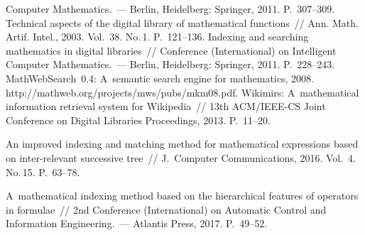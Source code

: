 \begin{multicols}{2}
{{\begin{thebibliography}{99}
Computer Mathematics.~--- Berlin, Heidelberg: Springer, 2011. P.~307--309.
 Technical aspects of the digital library of mathematical 
functions~// Ann. Math. Artif. Intel., 2003. Vol.~38. No.\,1. P.~121--136.
 Indexing and searching 
mathematics in digital libraries~// Conference (International) on Intelligent Computer 
Mathematics.~--- Berlin, Heidelberg: Springer, 2011. P.~228--243. 
 MathWebSearch~0.4: 
A~semantic search engine for mathematics, 2008. {\sf  
http://mathweb.org/\linebreak projects/mws/pubs/mkm08.pdf}.
 Wikimirs: A~mathematical 
information retrieval system for Wikipedia~// 13th ACM/IEEE-CS Joint Conference on Digital 
Libraries Proceedings, 2013. P.~11--20. 

 An improved indexing and matching method for 
mathematical expressions based on inter-relevant successive tree~// J.~Computer  
Communications, 2016. Vol.~4. No.\,15. P.~63--78.

 A~mathematical indexing method based on the hierarchical features of operators in 
formulae~// 2nd  Conference (International) on Automatic Control and Information 
Engineering.~--- Atlantis Press, 2017. P.~49--52.


\end{thebibliography}}}
\end{multicols}
